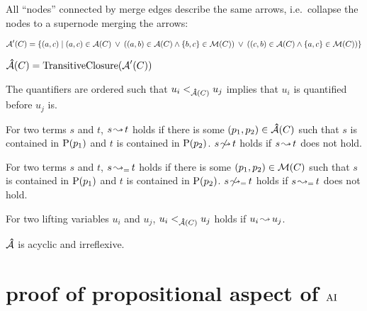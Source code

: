 \documentclass[,%
	paper=a4,%
	DIV12, %
	twoside=false,%
	liststotoc,
	bibtotoc,
	draft=false,%
	numbers=noendperiod
]{scrartcl}
\begin{document}
All ``nodes'' connected by merge edges describe the same arrows, i.e.~collapse the nodes to a supernode merging the arrows:


$\operatorname{\mathcal{A}}'(C) = \{ (a,c) \mid  (a,c) \in  \operatorname{\mathcal{A}}(C) \;\,{\lor}\;\, ((a,b) \in \operatorname{\mathcal{A}}(C) \land \{b, c\} \in \operatorname{\operatorname{\mathcal{M}}}(C) ) \;\,{\lor}\;\,  ((c, b) \in \operatorname{\mathcal{A}}(C) \land \{a, c\} \in \operatorname{\operatorname{\mathcal{M}}}(C)) \}$


$\operatorname{{\mathcal{\bm{\hat}A}}}(C) = \operatorname{TransitiveClosure}(\operatorname{\mathcal{A}}'(C))$

The quantifiers are ordered such that $u_i <_{\operatorname{{\mathcal{\bm{\hat}A}}}(C)} u_j$ implies that $u_i$ is quantified before $u_j$ is.




\begin{defi}
	For two terms $s$ and $t$, $s\operatorname{\leadsto} t$ holds if there is some $(p_1, p_2) \in \operatorname{{\mathcal{\bm{\hat}A}}}(C)$ such that $s$ is contained in $\operatorname{{\operatorname P}}(p_1)$ and $t$ is contained in $\operatorname{{\operatorname P}}(p_2)$. $s\operatorname{\not\leadsto} t$ holds if $s\operatorname{\leadsto} t$ does not hold.

	For two terms $s$ and $t$, $s\operatorname{\leadsto_=} t$ holds if there is some $(p_1, p_2) \in \operatorname{\mathcal{M}}(C)$ such that $s$ is contained in $\operatorname{{\operatorname P}}(p_1)$ and $t$ is contained in $\operatorname{{\operatorname P}}(p_2)$.
 $s\operatorname{\not\leadsto_=} t$ holds if $s\operatorname{\leadsto_=} t$ does not hold.
\end{defi}

\begin{defi}
	For two lifting variables $u_i$ and $u_j$, $u_i <_{\operatorname{{\mathcal{\bm{\hat}A}}}(C)} u_j$ holds if $u_i \operatorname{\leadsto} u_j$.
\end{defi}

\begin{conj}
	$\operatorname{{\mathcal{\bm{\hat}A}}}$ is acyclic and irreflexive.
\end{conj}


\clearpage

\section{proof of propositional aspect of $\operatorname{AI}$}
\end{document}
